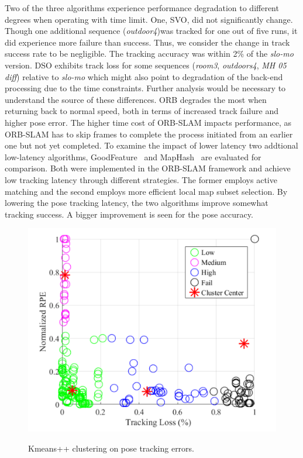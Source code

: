 Two of the three algorithms experience performance degradation to different
degrees when operating with time limit. One, SVO, did not significantly
change.  Though one additional sequence (\textit{outdoor4})was tracked
for one out of five runs, it did experience more failure than success.
Thus, we consider the change in track success rate to be negligible. The
tracking accuracy was within 2\% of the \textit{slo-mo} version. DSO
exhibits track loss for some sequences 
(\textit{room3}, \textit{outdoors4}, \textit{MH 05 diff}) relative to
\textit{slo-mo} which might also point to degradation of the back-end
processing due to the time constraints.  Further analysis would be
necessary to understand the source of these differences.
ORB degrades the most when returning back to normal speed, both in terms
of increased track failure and higher pose error. The higher time cost
of ORB-SLAM impacts performance, as ORB-SLAM has to skip frames to
complete the process initiated from an earlier one but not yet completed.
To examine the impact of lower latency two addtional low-latency algorithms, 
GoodFeature~\cite{zhao2019tro} and MapHash~\cite{zhao2019maphash} are
evaluated for comparison. 
Both were implemented in the ORB-SLAM framework and achieve low tracking
latency through different strategies. The former employs active matching
and the second employs more efficient local map subset selection. 
By lowering the pose tracking latency, the two algorithms improve
somewhat tracking success. A bigger improvement is seen for the pose
accuracy.

\begin{figure}[!t]
	\centering
	\includegraphics[width=0.9\linewidth]{./clustering2.pdf} \\
	\caption{Kmeans++ clustering on pose tracking errors.
 \label{fig:clustering}}
\end{figure}

